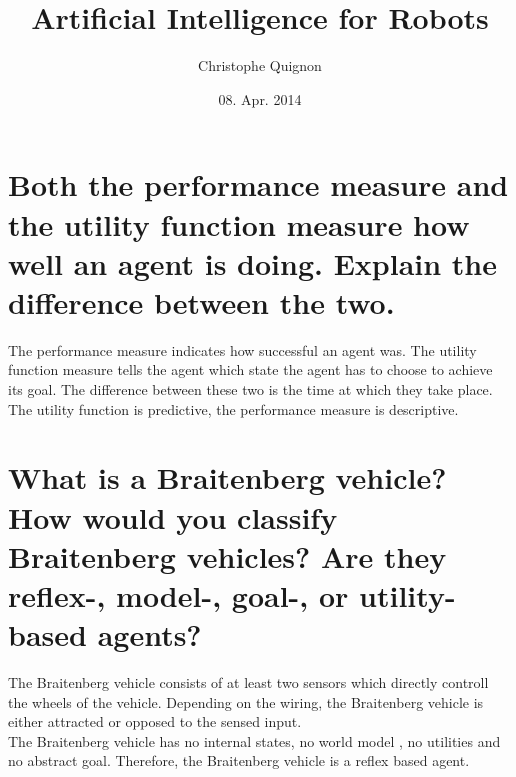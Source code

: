 \documentclass{scrreprt}
\author{Christophe Quignon}
\date{08. Apr. 2014}
\title{Artificial Intelligence for Robots}
\begin{document}
\maketitle
\section*{Both the performance measure and the utility function measure how well an agent is doing.
Explain the difference between the two.}
The performance measure indicates how successful an agent was. 
The utility function measure tells the agent which state the agent has to choose to achieve its goal.
The difference between these two is the time at which they take place. The utility function is predictive, the performance measure is descriptive.
\section*{What is a Braitenberg vehicle? How would you classify Braitenberg vehicles? Are they
reflex-, model-, goal-, or utility-based agents?}
The Braitenberg vehicle consists of at least two sensors which directly controll the wheels of the vehicle. Depending on the wiring, the Braitenberg vehicle is either attracted or opposed to the sensed input.\\
The Braitenberg vehicle has no internal states, no world model , no utilities and no abstract goal. Therefore, the Braitenberg vehicle is a reflex based agent.
\end{document}
